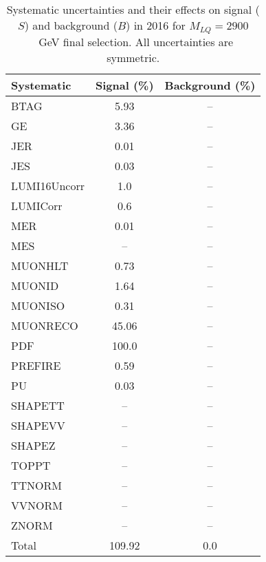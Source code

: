 \begin{table}[htbp]
\begin{center}
\caption{Systematic uncertainties and their effects on signal ($S$) and background ($B$) in 2016 for $M_{LQ}=2900$~GeV final selection. All uncertainties are symmetric.}
\begin{tabular}{lcc}
\hline\hline
Systematic & Signal (\%) & Background (\%) \\ \hline 
BTAG & 5.93 & --\\ 
GE & 3.36 & --\\ 
JER & 0.01 & --\\ 
JES & 0.03 & --\\ 
LUMI16Uncorr & 1.0 & --\\ 
LUMICorr & 0.6 & --\\ 
MER & 0.01 & --\\ 
MES & -- & --\\ 
MUONHLT & 0.73 & --\\ 
MUONID & 1.64 & --\\ 
MUONISO & 0.31 & --\\ 
MUONRECO & 45.06 & --\\ 
PDF & 100.0 & --\\ 
PREFIRE & 0.59 & --\\ 
PU & 0.03 & --\\ 
SHAPETT & -- & --\\ 
SHAPEVV & -- & --\\ 
SHAPEZ & -- & --\\ 
TOPPT & -- & --\\ 
TTNORM & -- & --\\ 
VVNORM & -- & --\\ 
ZNORM & -- & --\\ 
Total & 109.92 & 0.0\\ \hline \hline
\end{tabular}
\label{tab:SysUncertainties_uujj_2900}
\end{center}
\end{table}

